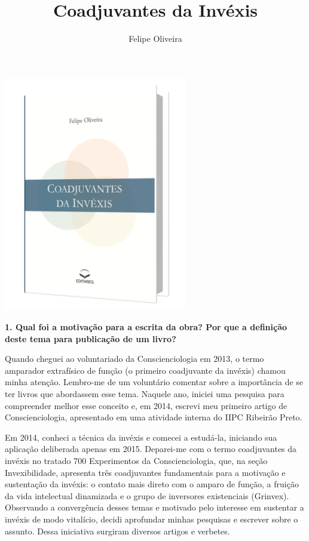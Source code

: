 \documentclass{gescons}
\author{Felipe Oliveira}
\title{Coadjuvantes da Invéxis}
\begin{document}
    \makeentrevistatitle

    \begin{multicols}{2}

\begin{center}
    \includegraphics[width=8cm]{articles/entrevista/mockups/Felipe_Oliveira.png}
\end{center}


\textbf{1. Qual foi a motivação para a escrita da obra? Por que a definição deste tema para publicação de um livro?}

Quando cheguei ao voluntariado da Conscienciologia em 2013, o termo amparador extrafísico de função (o primeiro coadjuvante da invéxis) chamou minha atenção. Lembro-me de um voluntário comentar sobre a importância de se ter livros que abordassem esse tema. Naquele ano, iniciei uma pesquisa para compreender melhor esse conceito e, em 2014, escrevi meu primeiro artigo de Conscienciologia, apresentado em uma atividade interna do IIPC Ribeirão Preto.

Em 2014, conheci a técnica da invéxis e comecei a estudá-la, iniciando sua aplicação deliberada apenas em 2015. Deparei-me com o termo coadjuvantes da invéxis no tratado 700 Experimentos da Conscienciologia, que, na seção Invexibilidade, apresenta três coadjuvantes fundamentais para a motivação e sustentação da invéxis: o contato mais direto com o amparo de função, a fruição da vida intelectual dinamizada e o grupo de inversores existenciais (Grinvex). Observando a convergência desses temas e motivado pelo interesse em sustentar a invéxis de modo vitalício, decidi aprofundar minhas pesquisas e escrever sobre o assunto. Dessa iniciativa surgiram diversos artigos e verbetes.


\end{multicols}
\end{document}
